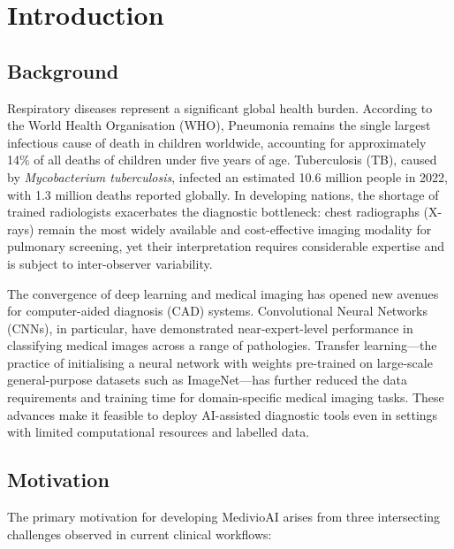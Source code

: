 \documentclass[12pt, a4paper, oneside]{report}
\begin{document}
\chapter{Introduction}
\label{chap:introduction}

\section{Background}
\label{sec:background}

Respiratory diseases represent a significant global health burden. According to the World Health Organisation (WHO), Pneumonia remains the single largest infectious cause of death in children worldwide, accounting for approximately 14\% of all deaths of children under five years of age. Tuberculosis (TB), caused by \textit{Mycobacterium tuberculosis}, infected an estimated 10.6 million people in 2022, with 1.3 million deaths reported globally. In developing nations, the shortage of trained radiologists exacerbates the diagnostic bottleneck: chest radiographs (X-rays) remain the most widely available and cost-effective imaging modality for pulmonary screening, yet their interpretation requires considerable expertise and is subject to inter-observer variability.

The convergence of deep learning and medical imaging has opened new avenues for computer-aided diagnosis (CAD) systems. Convolutional Neural Networks (CNNs), in particular, have demonstrated near-expert-level performance in classifying medical images across a range of pathologies. Transfer learning---the practice of initialising a neural network with weights pre-trained on large-scale general-purpose datasets such as ImageNet---has further reduced the data requirements and training time for domain-specific medical imaging tasks. These advances make it feasible to deploy AI-assisted diagnostic tools even in settings with limited computational resources and labelled data.

\section{Motivation}
\label{sec:motivation}

The primary motivation for developing MedivioAI arises from three intersecting challenges observed in current clinical workflows:
\end{document}
